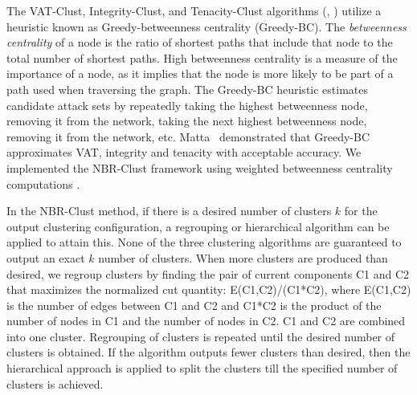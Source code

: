 \documentclass{bmcart}
\begin{document}
The VAT-Clust, Integrity-Clust, and Tenacity-Clust algorithms (\cite{FLAIRS}, \cite{ICDM}) utilize a heuristic known as Greedy-betweenness centrality (Greedy-BC). 
The \textit{betweenness centrality} of a node is the ratio of shortest paths that include that node to the total number of shortest paths. High betweenness centrality is a measure of the importance of a node, as it implies that the node is more likely to be part of a path used when traversing the graph.
The Greedy-BC heuristic estimates candidate attack sets by repeatedly taking the highest betweenness node, removing it from the network, taking the next highest betweenness node, removing it from the network, etc. Matta~\cite{matta2017comparison,matta2017vertex} demonstrated that Greedy-BC approximates VAT, integrity and tenacity with acceptable accuracy. We implemented the NBR-Clust framework using weighted betweenness centrality computations \cite{brandes2001faster}. 


In the NBR-Clust method, if there is a desired number of clusters $k$ for the output clustering configuration, a regrouping or hierarchical \cite{FLAIRS} algorithm can be applied to attain this. 
None of the three clustering algorithms are guaranteed to output an exact $k$ number of clusters.   
When more clusters are produced than desired, we regroup clusters by finding the pair of current components C1 and C2 that maximizes the normalized cut quantity: E(C1,C2)/(C1*C2), where E(C1,C2) is the number of edges between C1 and C2 and C1*C2 is the product of the number of nodes in C1 and the number of nodes in C2.  
C1 and C2 are combined into one cluster. Regrouping of clusters is repeated until the desired number of clusters is obtained. 
If the algorithm outputs fewer clusters than desired, then the hierarchical approach \cite{FLAIRS} is applied to split the clusters till the specified number of clusters is achieved. 
\end{document}
